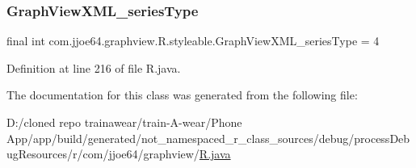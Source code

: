 \subsubsection{\texorpdfstring{GraphViewXML\_seriesType}{GraphViewXML\_seriesType}}
{\footnotesize\ttfamily final int com.\+jjoe64.\+graphview.\+R.\+styleable.\+Graph\+View\+X\+M\+L\+\_\+series\+Type = 4\hspace{0.3cm}{\ttfamily [static]}}



Definition at line 216 of file R.\+java.



The documentation for this class was generated from the following file\+:\begin{DoxyCompactItemize}
\item 
D\+:/cloned repo trainawear/train-\/\+A-\/wear/\+Phone App/app/build/generated/not\+\_\+namespaced\+\_\+r\+\_\+class\+\_\+sources/debug/process\+Debug\+Resources/r/com/jjoe64/graphview/\mbox{\hyperlink{process_debug_resources_2r_2com_2jjoe64_2graphview_2_r_8java}{R.\+java}}\end{DoxyCompactItemize}
